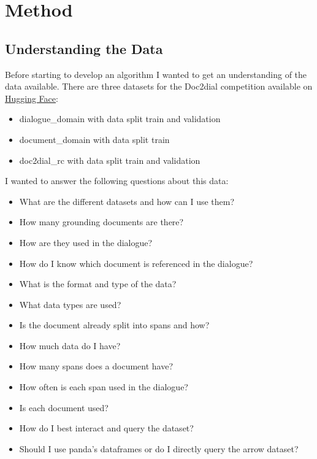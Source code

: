 \documentclass[11pt]{article}
\begin{document}
    \section{Method}\label{sec:method}

    \subsection{Understanding the Data}\label{subsec:understanding-the-data-method}
    Before starting to develop an algorithm I wanted to get an understanding of the data available.
    There are three datasets for the Doc2dial competition available on \href{https://huggingface.co/datasets/doc2dial}{Hugging Face}:
    \begin{itemize}
        \item dialogue\_domain with data split train and validation
        \item document\_domain with data split train
        \item doc2dial\_rc with data split train and validation
    \end{itemize}

    I wanted to answer the following questions about this data:
    \begin{itemize}
        \item What are the different datasets and how can I use them?
        \item How many grounding documents are there?
        \item How are they used in the dialogue?
        \item How do I know which document is referenced in the dialogue?
        \item What is the format and type of the data?
        \item What data types are used?
        \item Is the document already split into spans and how?
        \item How much data do I have?
        \item How many spans does a document have?
        \item How often is each span used in the dialogue?
        \item Is each document used?
        \item How do I best interact and query the dataset?
        \item Should I use panda's dataframes or do I directly query
        the arrow dataset?
    \end{itemize}
\end{document}
